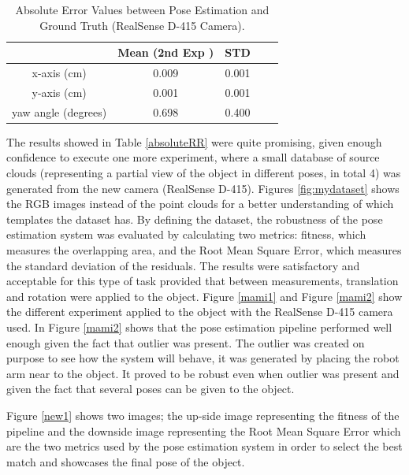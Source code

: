 \begin{table}[ht]
\renewcommand{\arraystretch}{1.3}
\caption{Absolute Error Values between Pose Estimation and Ground Truth (RealSense D-415 Camera).}
\label{abso}
\centering
\begin{tabular}{|c|c|c|c|c|}
\hline
  & Mean (2nd Exp )& STD \\
\hline
x-axis (cm) & 0.009 & 0.001
 \\
\hline
y-axis (cm) & 0.001 & 0.001  \\
\hline
yaw angle (degrees)& 0.698 & 0.400 \\
\hline
\end{tabular}
\end{table}

The results showed in Table \ref{absoluteRR} were quite promising, given enough confidence to execute one more experiment, where a small database of source clouds (representing a partial view of the object in different poses, in total 4) was generated from the new camera (RealSense D-415). Figures \ref{fig:mydataset} shows the RGB images instead of the point clouds for a better understanding of which templates the dataset has. By defining the dataset, the robustness of the pose estimation system was evaluated by calculating two metrics: fitness, which measures the overlapping area, and the Root Mean Square Error, which measures the standard deviation of the residuals. The results were satisfactory and acceptable for this type of task provided that between measurements, translation and rotation were applied to the object. Figure \ref{mami1} and Figure \ref{mami2} show the different experiment applied to the object with the RealSense D-415 camera used. In Figure \ref{mami2} shows that the pose estimation pipeline performed well enough given the fact that outlier was present. The outlier was created on purpose to see how the system will behave, it was generated by placing the robot arm near to the object. It proved to be robust even when outlier was present and given the fact that several poses can be given to the object.  

Figure \ref{new1} shows two images; the up-side image representing the fitness of the pipeline and the downside image representing the Root Mean Square Error which are the two metrics used by the pose estimation system in order to select the best match and showcases the final pose of the object.


